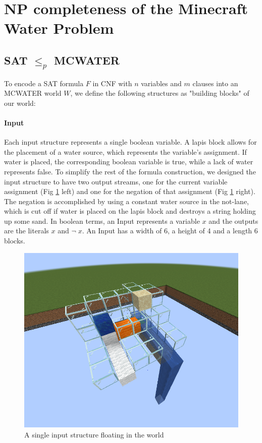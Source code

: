 \section{NP completeness of the Minecraft Water Problem}


\subsection{SAT $\leq_p$ MCWATER}
To encode a SAT formula $F$ in CNF with $n$ variables and $m$ clauses into an MCWATER world $W$, we define the following structures as "building blocks" of our world:



\paragraph{Input}
Each input structure represents a single boolean variable. A lapis block allows for the placement of a water source, which represents the variable's assignment. If water is placed, the corresponding boolean variable is true, while a lack of water represents false. To simplify the rest of the formula construction, we designed the input structure to have two output streams, one for the current variable assignment (Fig \ref{fig:input} left) and one for the negation of that assignment (Fig \ref{fig:input} right). The negation is accomplished by using a constant water source in the not-lane, which is cut off if water is placed on the lapis block and destroys a string holding up some sand. In boolean terms, an Input represents a variable $x$ and the outputs are the literals $x$ and $\neg \; x$. An Input has a width of 6, a height of 4 and a length 6 blocks.

\begin{figure}[h]
    \centering
    \includegraphics[width=0.5\linewidth]{images/input.png}
    \caption{A single input structure floating in the world}
    \label{fig:input}
\end{figure}



